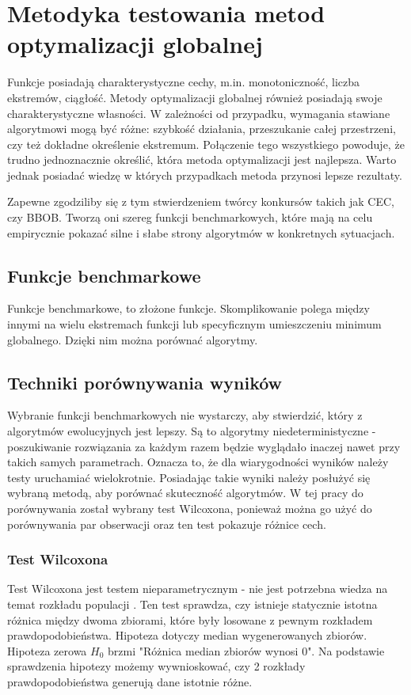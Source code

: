 \documentclass{mini}
\begin{document}
\pagebreak

\section{Metodyka testowania metod optymalizacji globalnej}
Funkcje posiadają charakterystyczne cechy, m.in. monotoniczność, liczba ekstremów, ciągłość. Metody optymalizacji globalnej również posiadają swoje charakterystyczne własności. W zależności od przypadku, wymagania stawiane algorytmowi mogą być różne: szybkość działania, przeszukanie całej przestrzeni, czy też dokładne określenie ekstremum. Połączenie tego wszystkiego powoduje, że trudno jednoznacznie określić, która metoda optymalizacji jest najlepsza. Warto jednak posiadać wiedzę w których przypadkach metoda przynosi lepsze rezultaty.

Zapewne zgodziliby się z tym stwierdzeniem twórcy konkursów takich jak CEC, czy BBOB. Tworzą oni szereg funkcji benchmarkowych, które mają na celu empirycznie pokazać silne i słabe strony algorytmów w konkretnych sytuacjach.

\subsection{Funkcje benchmarkowe}
Funkcje benchmarkowe, to złożone funkcje. Skomplikowanie polega między innymi na wielu ekstremach funkcji lub specyficznym umieszczeniu minimum globalnego. Dzięki nim można porównać algorytmy.

\subsection{Techniki porównywania wyników}
Wybranie funkcji benchmarkowych nie wystarczy, aby stwierdzić, który z algorytmów ewolucyjnych jest lepszy. Są to algorytmy niedeterministyczne - poszukiwanie rozwiązania za każdym razem będzie wyglądało inaczej nawet przy takich samych parametrach. Oznacza to, że dla wiarygodności wyników należy testy uruchamiać wielokrotnie. Posiadając takie wyniki należy posłużyć się wybraną metodą, aby porównać skuteczność algorytmów. W tej pracy do porównywania został wybrany test Wilcoxona, ponieważ można go użyć do porównywania par obserwacji oraz ten test pokazuje różnice cech.

\subsubsection*{Test Wilcoxona}
Test Wilcoxona jest testem nieparametrycznym - nie jest potrzebna wiedza na temat rozkładu populacji \cite{wilcox}. Ten test sprawdza, czy istnieje statycznie istotna różnica między dwoma zbiorami, które były losowane z pewnym rozkładem prawdopodobieństwa. Hipoteza dotyczy median wygenerowanych zbiorów. Hipoteza zerowa $H_0$ brzmi "Różnica median zbiorów wynosi 0". Na podstawie sprawdzenia hipotezy możemy wywnioskować, czy 2 rozkłady prawdopodobieństwa generują dane istotnie różne.
\end{document}
